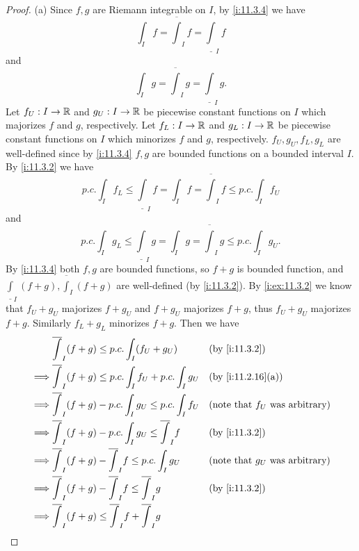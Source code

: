 \begin{proof}{(a)}
  Since \(f, g\) are Riemann integrable on \(I\), by \cref{i:11.3.4} we have
  \[
    \int_I f = \overline{\int}_I f = \underline{\int}_I f
  \]
  and
  \[
    \int_I g = \overline{\int}_I g = \underline{\int}_I g.
  \]
  Let \(f_U : I \to \mathbb{R}\) and \(g_U : I \to \mathbb{R}\) be piecewise constant functions on \(I\) which majorizes \(f\) and \(g\), respectively.
  Let \(f_L : I \to \mathbb{R}\) and \(g_L : I \to \mathbb{R}\) be piecewise constant functions on \(I\) which minorizes \(f\) and \(g\), respectively.
  \(f_U, g_U, f_L, g_L\) are well-defined since by \cref{i:11.3.4} \(f, g\) are bounded functions on a bounded interval \(I\).
  By \cref{i:11.3.2} we have
  \[
    p.c. \int_I f_L \leq \underline{\int}_I f = \int_I f = \overline{\int}_I f \leq p.c. \int_I f_U
  \]
  and
  \[
    p.c. \int_I g_L \leq \underline{\int}_I g = \int_I g = \overline{\int}_I g \leq p.c. \int_I g_U.
  \]
  By \cref{i:11.3.4} both \(f, g\) are bounded functions, so \(f + g\) is bounded function, and \(\underline{\int}_I (f + g), \overline{\int}_I (f + g)\) are well-defined (by \cref{i:11.3.2}).
  By \cref{i:ex:11.3.2} we know that \(f_U + g_U\) majorizes \(f + g_U\) and \(f + g_U\) majorizes \(f + g\), thus \(f_U + g_U\) majorizes \(f + g\).
  Similarly \(f_L + g_L\) minorizes \(f + g\).
  Then we have
  \begin{align*}
             & \overline{\int}_I (f + g) \leq p.c. \int_I (f_U + g_U)                   &   & \by{i:11.3.2}                            \\
    \implies & \overline{\int}_I (f + g) \leq p.c. \int_I f_U + p.c. \int_I g_U         &   & \by{i:11.2.16}[a]                        \\
    \implies & \overline{\int}_I (f + g) - p.c. \int_I g_U \leq p.c. \int_I f_U         &   & \text{(note that \(f_U\) was arbitrary)} \\
    \implies & \overline{\int}_I (f + g) - p.c. \int_I g_U \leq \overline{\int}_I f     &   & \by{i:11.3.2}                            \\
    \implies & \overline{\int}_I (f + g) - \overline{\int}_I f \leq p.c. \int_I g_U     &   & \text{(note that \(g_U\) was arbitrary)} \\
    \implies & \overline{\int}_I (f + g) - \overline{\int}_I f \leq \overline{\int}_I g &   & \by{i:11.3.2}                            \\
    \implies & \overline{\int}_I (f + g) \leq \overline{\int}_I f + \overline{\int}_I g &                                              \\

\end{align*}
\end{proof}
